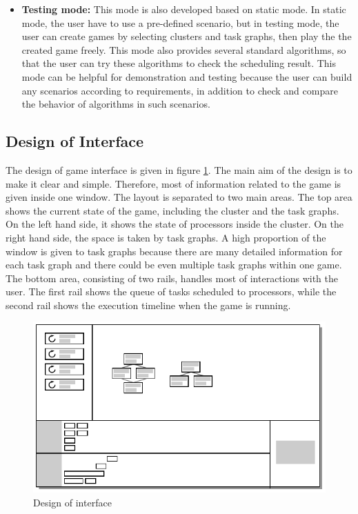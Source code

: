 \documentclass[msc,deptreport, cs]{infthesis}
\begin{document}
\begin{itemize}
  \item \textbf{Testing mode:} This mode is also developed based on static mode. In static mode, the user have to use a pre-defined scenario, but in testing mode, the user can create games by selecting clusters and task graphs, then play the the created game freely. This mode also provides several standard algorithms, so that the user can try these algorithms to check the scheduling result. This mode can be helpful for demonstration and testing because the user can build any scenarios according to requirements, in addition to check and compare the behavior of algorithms in such scenarios.
\end{itemize}

\subsection{Design of Interface} \label{sec:interface}

The design of game interface is given in figure \ref{fig:layout}. The main aim of the design is to make it clear and simple. Therefore, most of information related to the game is given inside one window. The layout is separated to two main areas. The top area shows the current state of the game, including the cluster and the task graphs. On the left hand side, it shows the state of processors inside the cluster. On the right hand side, the space is taken by task graphs. A high proportion of the window is given to task graphs because there are many detailed information for each task graph and there could be even multiple task graphs within one game. The bottom area, consisting of two rails, handles most of interactions with the user. The first rail shows the queue of tasks scheduled to processors, while the second rail shows the execution timeline when the game is running.

\begin{figure}[!htb]
  \centering
  \includegraphics[width=0.8\columnwidth]{layout.pdf}
  \caption{Design of interface}
  \label{fig:layout}
\end{figure}
\end{document}
